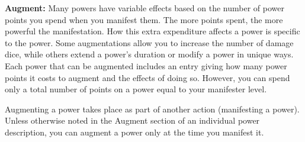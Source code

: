 \textbf{Augment:} Many powers have variable effects based on the number of power points you spend when you manifest them. The more points spent, the more powerful the manifestation. How this extra expenditure affects a power is specific to the power. Some augmentations allow you to increase the number of damage dice, while others extend a power's duration or modify a power in unique ways. Each power that can be augmented includes an entry giving how many power points it costs to augment and the effects of doing so. However, you can spend only a total number of points on a power equal to your manifester level.

Augmenting a power takes place as part of another action (manifesting a power). Unless otherwise noted in the Augment section of an individual power description, you can augment a power only at the time you manifest it.

